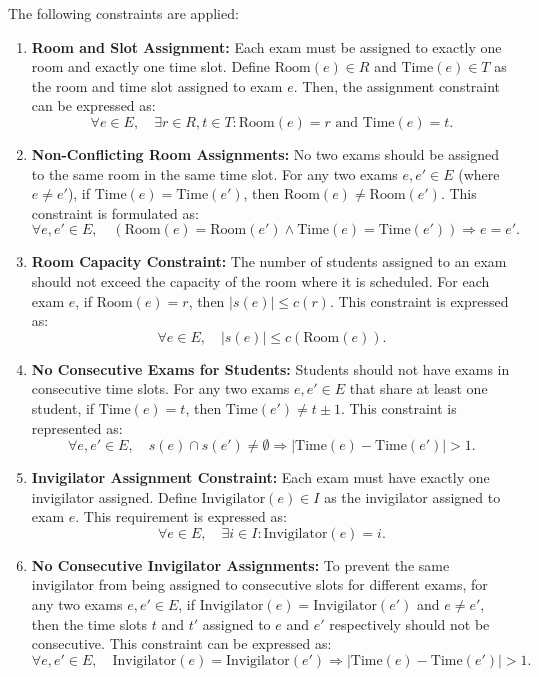 \documentclass[a4paper]{article}
\begin{document}
    The following constraints are applied:
    
    \begin{enumerate}
        \item \textbf{Room and Slot Assignment:} Each exam must be assigned to exactly one room and exactly one time slot. Define \( \text{Room}(e) \in R \) and \( \text{Time}(e) \in T \) as the room and time slot assigned to exam \( e \). Then, the assignment constraint can be expressed as:
        \[
        \forall e \in E, \quad \exists r \in R, t \in T : \text{Room}(e) = r \text{ and } \text{Time}(e) = t.
        \]
    
        \item \textbf{Non-Conflicting Room Assignments:} No two exams should be assigned to the same room in the same time slot. For any two exams \( e, e' \in E \) (where \( e \neq e' \)), if \( \text{Time}(e) = \text{Time}(e') \), then \( \text{Room}(e) \neq \text{Room}(e') \). This constraint is formulated as:
        \[
        \forall e, e' \in E, \quad (\text{Room}(e) = \text{Room}(e') \land \text{Time}(e) = \text{Time}(e')) \Rightarrow e = e'.
        \]        
    
        \item \textbf{Room Capacity Constraint:} The number of students assigned to an exam should not exceed the capacity of the room where it is scheduled. For each exam \( e \), if \( \text{Room}(e) = r \), then \( |s(e)| \leq c(r) \). This constraint is expressed as:
        \[
        \forall e \in E, \quad |s(e)| \leq c(\text{Room}(e)).
        \]
    
        \item \textbf{No Consecutive Exams for Students:} Students should not have exams in consecutive time slots. For any two exams \( e, e' \in E \) that share at least one student, if \( \text{Time}(e) = t \), then \( \text{Time}(e') \neq t \pm 1 \). This constraint is represented as:
        \[
        \forall e, e' \in E, \quad s(e) \cap s(e') \neq \emptyset \Rightarrow |\text{Time}(e) - \text{Time}(e')| > 1.
        \]
    
        \item \textbf{Invigilator Assignment Constraint:} Each exam must have exactly one invigilator assigned. Define \( \text{Invigilator}(e) \in I \) as the invigilator assigned to exam \( e \). This requirement is expressed as:
        \[
        \forall e \in E, \quad \exists i \in I : \text{Invigilator}(e) = i.
        \]
    
        \item \textbf{No Consecutive Invigilator Assignments:} To prevent the same invigilator from being assigned to consecutive slots for different exams, for any two exams \( e, e' \in E \), if \( \text{Invigilator}(e) = \text{Invigilator}(e') \) and \( e \neq e' \), then the time slots \( t \) and \( t' \) assigned to \( e \) and \( e' \) respectively should not be consecutive. This constraint can be expressed as:
        \[
        \forall e, e' \in E, \quad \text{Invigilator}(e) = \text{Invigilator}(e') \Rightarrow |\text{Time}(e) - \text{Time}(e')| > 1.
        \]
    \end{enumerate}
    
\end{document}

